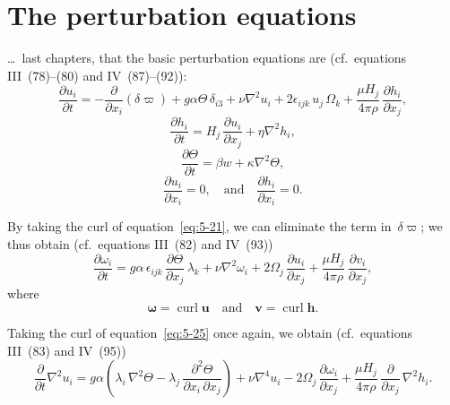 \section{The perturbation equations}\label{sec:51}

\noindent
\ldots\ last chapters, that the basic perturbation equations are (cf.\ equations
III~(78)--(80) and IV~(87)--(92)):
\begin{equation}
  \frac{\partial u_i}{\partial t}
  = -\frac{\partial}{\partial x_i}(\delta\varpi)
  + g\alpha\Theta\,\delta_{i3}
  + \nu\nabla^{2}u_i
  + 2\epsilon_{ijk}\,u_j\,\Omega_k
  + \frac{\mu H_j}{4\pi\rho}\,\frac{\partial h_i}{\partial x_j},
  \label{eq:5-21}
\end{equation}
\begin{equation}
  \frac{\partial h_i}{\partial t}
  = H_j\,\frac{\partial u_i}{\partial x_j}+\eta\nabla^{2}h_i,
  \label{eq:5-22}
\end{equation}
\begin{equation}
  \frac{\partial\Theta}{\partial t}
  = \beta w + \kappa\nabla^{2}\Theta,
  \label{eq:5-23}
\end{equation}
\begin{equation}
  \frac{\partial u_i}{\partial x_i} = 0, \quad\text{and}\quad
  \frac{\partial h_i}{\partial x_i} = 0.
  \label{eq:5-24}
\end{equation}

By taking the curl of equation~\eqref{eq:5-21}, we can eliminate the term
in~$\delta\varpi$; we thus obtain (cf.\ equations III~(82) and IV~(93))
\begin{equation}
  \frac{\partial\omega_i}{\partial t}
  = g\alpha\,\epsilon_{ijk}\,\frac{\partial\Theta}{\partial x_j}\,\lambda_k
  + \nu\nabla^{2}\omega_i
  + 2\Omega_j\,\frac{\partial u_i}{\partial x_j}
  + \frac{\mu H_j}{4\pi\rho}\,\frac{\partial v_i}{\partial x_j},
  \label{eq:5-25}
\end{equation}
where
\begin{equation}
  \boldsymbol{\omega} = \operatorname{curl}\mathbf{u}
  \quad\text{and}\quad
  \mathbf{v} = \operatorname{curl}\mathbf{h}.
  \label{eq:5-26}
\end{equation}

Taking the curl of equation~\eqref{eq:5-25} once again, we obtain
(cf.\ equations III~(83) and IV~(95))
\begin{equation}
  \frac{\partial}{\partial t}\nabla^{2}u_i
  = g\alpha\!\left(
      \lambda_i\,\nabla^{2}\Theta
      - \lambda_j\,\frac{\partial^{2}\Theta}{\partial x_i\,\partial x_j}
    \right)
  + \nu\nabla^{4}u_i
  - 2\Omega_j\,\frac{\partial\omega_i}{\partial x_j}
  + \frac{\mu H_j}{4\pi\rho}\,\frac{\partial}{\partial x_j}\,\nabla^{2}h_i.
  \label{eq:5-27}
\end{equation}

